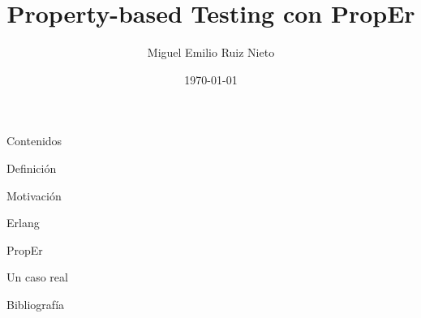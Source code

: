 \documentclass{beamer}
\title{Property-based Testing con PropEr}
\author{Miguel Emilio Ruiz Nieto}
\date{\today} %
\begin{document}
  \begin{frame}
    \titlepage
  \end{frame}

  \begin{frame}{Contenidos}
    \tableofcontents
  \end{frame}

  \begin{frame}{Definición}

  \end{frame}

  \begin{frame}{Motivación}

  \end{frame}

  \begin{frame}{Erlang}

  \end{frame}

  \begin{frame}{PropEr}

  \end{frame}

  \begin{frame}{Un caso real}

  \end{frame}

  \begin{frame}{Bibliografía}

  \end{frame}
\end{document}
